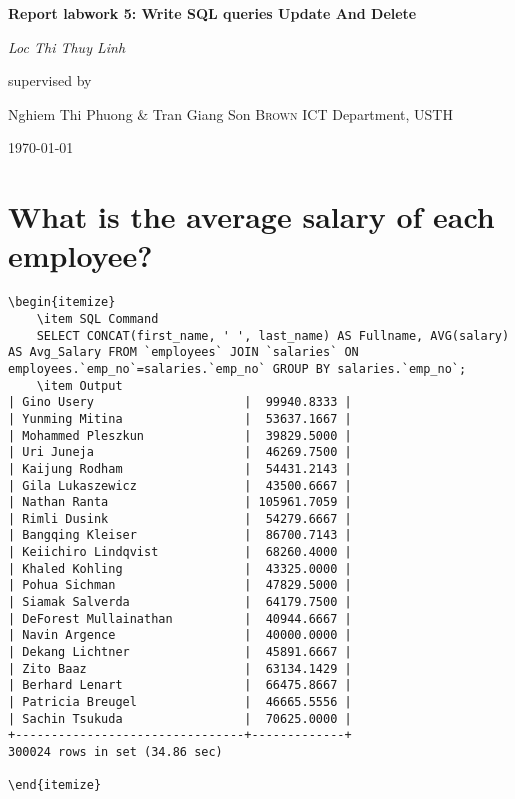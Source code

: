 \documentclass[13pt,a4paper]{report}
\begin{document}
\begin{titlepage}
	\centering
	\vspace{2cm}
	{\huge\bfseries Report labwork 5: Write SQL queries Update And Delete \par}
	\vspace{2cm}
	{\Large\itshape Loc Thi Thuy Linh\par}
	\vfill
	supervised by\par
	Nghiem Thi Phuong & Tran Giang Son \textsc{Brown}
	ICT Department, USTH\par
	\vfill
	{\large \today\par}
\end{titlepage}

\section{ What is the average salary of each employee? }

\begin{lstlisting}
\begin{itemize}
	\item SQL Command
	SELECT CONCAT(first_name, ' ', last_name) AS Fullname, AVG(salary) AS Avg_Salary FROM `employees` JOIN `salaries` ON employees.`emp_no`=salaries.`emp_no` GROUP BY salaries.`emp_no`;
	\item Output
| Gino Usery                     |  99940.8333 |
| Yunming Mitina                 |  53637.1667 |
| Mohammed Pleszkun              |  39829.5000 |
| Uri Juneja                     |  46269.7500 |
| Kaijung Rodham                 |  54431.2143 |
| Gila Lukaszewicz               |  43500.6667 |
| Nathan Ranta                   | 105961.7059 |
| Rimli Dusink                   |  54279.6667 |
| Bangqing Kleiser               |  86700.7143 |
| Keiichiro Lindqvist            |  68260.4000 |
| Khaled Kohling                 |  43325.0000 |
| Pohua Sichman                  |  47829.5000 |
| Siamak Salverda                |  64179.7500 |
| DeForest Mullainathan          |  40944.6667 |
| Navin Argence                  |  40000.0000 |
| Dekang Lichtner                |  45891.6667 |
| Zito Baaz                      |  63134.1429 |
| Berhard Lenart                 |  66475.8667 |
| Patricia Breugel               |  46665.5556 |
| Sachin Tsukuda                 |  70625.0000 |
+--------------------------------+-------------+
300024 rows in set (34.86 sec)

\end{itemize}
\end{lstlisting}
\end{document}
